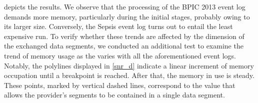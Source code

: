  depicts the results. We observe that the processing of the BPIC 2013 event log demands more memory, particularly during the initial stages, probably owing to its larger size. Conversely, the Sepsis event log turns out to entail the least expensive run. %
To verify whether these trends are affected by the dimension of the exchanged data segments, we conducted an additional test to examine the trend of memory usage as the {\SegSize} varies with all the aforementioned event logs. %
Notably, the polylines displayed in \cref{snr_d} indicate a linear increment of memory occupation until a breakpoint is reached. After that, the memory in use is steady. These points, marked by vertical dashed lines, correspond %
to the {\SegSize} value that allows the provider's segments to be contained in a single data segment.

